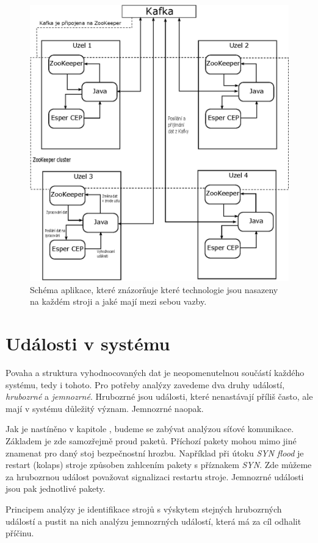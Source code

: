 \documentclass[
  digital, %
  table,   %
  nolof,     %
  nolot,     %
  oneside, %
  nocover,
  monochrome,
  12pt
]{fithesis3}
\begin{document}
\begin{figure}[H]
	\centering
    \includegraphics[width=.7\linewidth, height=.57\textheight]{images/app-architecture.eps}
    \caption{Schéma aplikace, které znázorňuje které technologie jsou nasazeny na každém stroji a jaké mají mezi sebou vazby.}
    \label{fig:app-architecture}
\end{figure}

\section{Události v systému}
\label{sec:udalosti-v-systemu}
Povaha a struktura vyhodnocovaných dat je neopomenutelnou součástí každého systému, tedy i tohoto. Pro potřeby analýzy zavedeme dva druhy událostí, \textit{hrubozrné} a \textit{jemnozrné}. Hrubozrné jsou události, které nenastávají příliš často, ale mají v systému důležitý význam. Jemnozrné naopak.

Jak je nastíněno v kapitole \label{sec:analysis}, budeme se zabývat analýzou síťové komunikace. Základem je zde samozřejmě proud paketů. Příchozí pakety mohou mimo jiné znamenat pro daný stoj bezpečnostní hrozbu. Například při útoku \textit{SYN flood} je restart (kolaps) stroje způsoben zahlcením pakety s příznakem \textit{SYN}. Zde můžeme za hrubozrnou událost považovat signalizaci restartu stroje. Jemnozrné události jsou pak jednotlivé pakety.

Principem analýzy je identifikace strojů s výskytem stejných hrubozrných událostí a pustit na nich analýzu jemnozrných událostí, která má za cíl odhalit příčinu.
 
\end{document}
